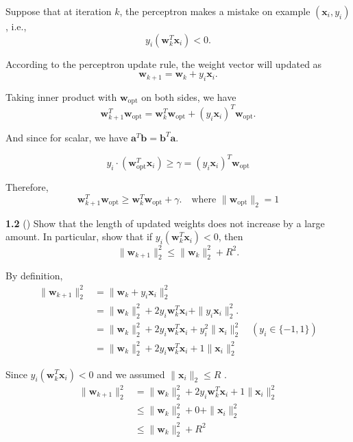 
Suppose that at iteration $k$, the perceptron makes a mistake on example
$(\mathbf{x}_{i}, y_i)$, i.e.,
\[
y_i (\mathbf{w}_k^T \mathbf{x}_i) < 0.
\]

According to the perceptron update rule, the weight vector will updated as
\[
\mathbf{w}_{k+1} = \mathbf{w}_k + y_i \mathbf{x}_i.
\]

Taking inner product with $\mathbf{w}_{\text{opt}}$ on both sides, we have
\[
\mathbf{w}_{k+1}^T \mathbf{w}_{\text{opt}}
= \mathbf{w}_k^T \mathbf{w}_{\text{opt}} + {(y_i \mathbf{x}_i)}^T \mathbf{w}_{\text{opt}}.
\]

And since for scalar, we have $\mathbf{a}^T \mathbf{b} = \mathbf{b}^T \mathbf{a}$.

\[
y_i\cdot (\mathbf{w}_{\text{opt}}^T\mathbf{x}_i) \geq \gamma = {(y_i \mathbf{x}_i)}^T \mathbf{w}_{\text{opt}}
\]

Therefore,
\[
\mathbf{w}_{k+1}^T \mathbf{w}_{\text{opt}}
\ge \mathbf{w}_k^T \mathbf{w}_{\text{opt}} + \gamma.
\quad \text{where } \|\mathbf{w}_{\text{opt}}\|_2 = 1
\]

\bigskip

\textbf{1.2} () Show that the length of updated weights does not increase by a large amount. In particular, show that if $y_i(\mathbf{w}_{k}^T\mathbf{x}_i) < 0$, then
\begin{equation}
    \|\mathbf{w}_{k+1}\|_2^2 \leq \|\mathbf{w}_k\|_2^2+R^2.
\end{equation}


By definition,
\begin{align*}
\| \mathbf{w}_{k+1} \|_2^2
&= \| \mathbf{w}_k + y_i \mathbf{x}_i \|_2^2 \\
&= \| \mathbf{w}_k \|_2^2+ 2 y_i \mathbf{w}_k^T \mathbf{x}_i+ \| y_i \mathbf{x}_i \|_2^2.\\
&= \| \mathbf{w}_k \|_2^2+ 2 y_i \mathbf{w}_k^T \mathbf{x}_i+ y_i^2\|  \mathbf{x}_i \|_2^2 \quad (y_i \in \{-1, 1\}) \\
&= \| \mathbf{w}_k \|_2^2+ 2 y_i \mathbf{w}_k^T \mathbf{x}_i+ 1\|  \mathbf{x}_i \|_2^2
\end{align*}

Since $y_i (\mathbf{w}_k^T \mathbf{x}_i) < 0$ and we assumed $\|\mathbf{x}_i\|_2 \leq R$ .
\begin{align*}
\| \mathbf{w}_{k+1} \|_2^2
&= \| \mathbf{w}_k \|_2^2+ 2 y_i \mathbf{w}_k^T \mathbf{x}_i+ 1\|  \mathbf{x}_i \|_2^2\\
&\leq \| \mathbf{w}_k \|_2^2+ 0+\|  \mathbf{x}_i \|_2^2\\
&\leq \| \mathbf{w}_k \|_2^2+{R^2}\\
\end{align*}

